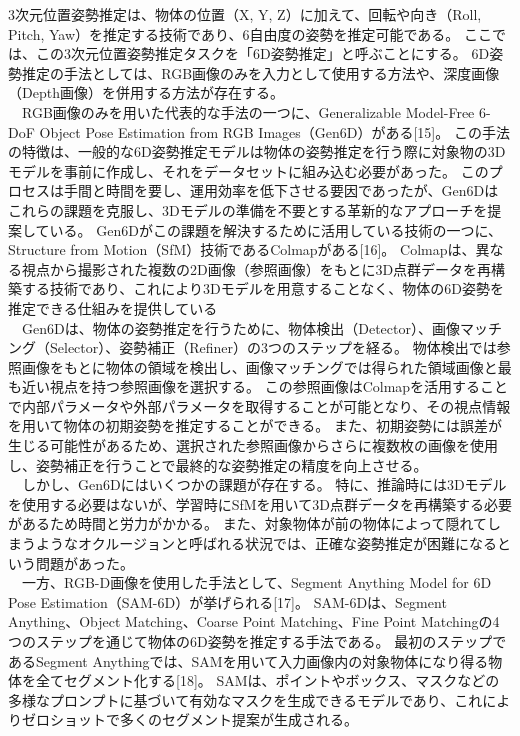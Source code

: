 3次元位置姿勢推定は、物体の位置（X, Y, Z）に加えて、回転や向き（Roll, Pitch, Yaw）を推定する技術であり、6自由度の姿勢を推定可能である。
ここでは、この3次元位置姿勢推定タスクを「6D姿勢推定」と呼ぶことにする。
6D姿勢推定の手法としては、RGB画像のみを入力として使用する方法や、深度画像（Depth画像）を併用する方法が存在する。\\
　RGB画像のみを用いた代表的な手法の一つに、Generalizable Model-Free 6-DoF Object Pose Estimation from RGB Images（Gen6D）がある[15]。
この手法の特徴は、一般的な6D姿勢推定モデルは物体の姿勢推定を行う際に対象物の3Dモデルを事前に作成し、それをデータセットに組み込む必要があった。
このプロセスは手間と時間を要し、運用効率を低下させる要因であったが、Gen6Dはこれらの課題を克服し、3Dモデルの準備を不要とする革新的なアプローチを提案している。
Gen6Dがこの課題を解決するために活用している技術の一つに、Structure from Motion（SfM）技術であるColmapがある[16]。
Colmapは、異なる視点から撮影された複数の2D画像（参照画像）をもとに3D点群データを再構築する技術であり、これにより3Dモデルを用意することなく、物体の6D姿勢を推定できる仕組みを提供している\\
　Gen6Dは、物体の姿勢推定を行うために、物体検出（Detector）、画像マッチング（Selector）、姿勢補正（Refiner）の3つのステップを経る。
物体検出では参照画像をもとに物体の領域を検出し、画像マッチングでは得られた領域画像と最も近い視点を持つ参照画像を選択する。
この参照画像はColmapを活用することで内部パラメータや外部パラメータを取得することが可能となり、その視点情報を用いて物体の初期姿勢を推定することができる。
また、初期姿勢には誤差が生じる可能性があるため、選択された参照画像からさらに複数枚の画像を使用し、姿勢補正を行うことで最終的な姿勢推定の精度を向上させる。\\
　しかし、Gen6Dにはいくつかの課題が存在する。
特に、推論時には3Dモデルを使用する必要はないが、学習時にSfMを用いて3D点群データを再構築する必要があるため時間と労力がかかる。
また、対象物体が前の物体によって隠れてしまうようなオクルージョンと呼ばれる状況では、正確な姿勢推定が困難になるという問題があった。\\
　一方、RGB-D画像を使用した手法として、Segment Anything Model for 6D Pose Estimation（SAM-6D）が挙げられる[17]。
SAM-6Dは、Segment Anything、Object Matching、Coarse Point Matching、Fine Point Matchingの4つのステップを通じて物体の6D姿勢を推定する手法である。
最初のステップであるSegment Anythingでは、SAMを用いて入力画像内の対象物体になり得る物体を全てセグメント化する[18]。
SAMは、ポイントやボックス、マスクなどの多様なプロンプトに基づいて有効なマスクを生成できるモデルであり、これによりゼロショットで多くのセグメント提案が生成される。

